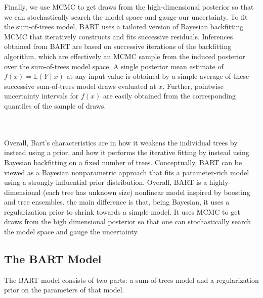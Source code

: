 \documentclass[a4paper,11pt]{article}
\begin{document}
Finally, we use MCMC to get draws from the high-dimensional posterior so that  we can stochastically search the model space and gauge our uncertainty. To fit the sum-of-trees model, BART uses a tailored version of Bayesian backfitting MCMC \cite{hastie2000} that iteratively constructs and fits successive residuals.  Inferences obtained from BART are based on successive iterations of the backfitting algorithm, which are effectively an MCMC sample from the induced posterior over the sum-of-trees model space. A single posterior mean estimate of \( f(x) = \mathbb{E}(Y \mid x) \) at any input value is obtained by a simple average of these successive sum-of-trees model draws evaluated at \( x \). Further, pointwise uncertainty intervals for \( f(x) \) are easily obtained from the corresponding quantiles of the sample of draws.


\\\\Overall, Bart's characteristics are in how it weakens the individual trees by instead using a prior, and how it performs the iterative fitting by instead using Bayesian backfitting on a fixed number of trees. 
Conceptually, BART can be viewed as a Bayesian nonparametric approach that fits a parameter-rich model using a strongly influential prior distribution. Overall, BART is a highly-dimensional (each tree has unknown size) nonlinear model inspired by boosting and tree ensembles. the main difference is that, being Bayesian, it uses a regularization prior to shrink towards a simple model. It uses MCMC to get draws from the high dimensional posterior so that one can stochastically search the  model space and gauge the uncertainty.

\subsection{The BART Model}
The BART model consists of two parts: a sum-of-trees model and a regularization prior on the parameters of that model.
\end{document}
